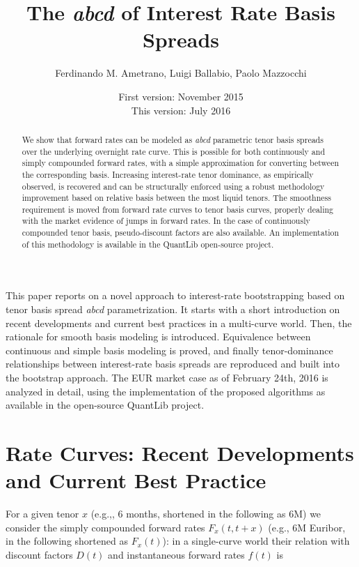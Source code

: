 \documentclass{article}
\title{The \textit{abcd} of Interest Rate Basis Spreads}
\author{Ferdinando M. Ametrano, Luigi Ballabio, Paolo Mazzocchi}
\date{First version: November 2015\\
      This version: July 2016}
\begin{document}
\maketitle

\begin{abstract}
    We show that forward rates can be modeled as \textit{abcd} parametric tenor basis spreads over the underlying overnight rate curve. This is possible for both continuously and simply compounded forward rates, with a simple approximation for converting between the corresponding basis. Increasing interest-rate tenor dominance, as empirically observed, is recovered and can be structurally enforced using a robust methodology improvement based on relative basis between the most liquid tenors. The smoothness requirement is moved from forward rate curves to tenor basis curves, properly dealing with the market evidence of jumps in forward rates. In the case of continuously compounded tenor basis, pseudo-discount factors are also available. An implementation of this methodology is available in the QuantLib open-source project.
\end{abstract}






\noindent
This paper reports on a novel approach to interest-rate bootstrapping based on tenor basis spread \textit{abcd} parametrization.
It starts with a short introduction on recent developments and current best practices in a multi-curve world. Then, the rationale for smooth basis modeling is introduced. Equivalence between continuous and simple basis modeling is proved, and finally tenor-dominance relationships between interest-rate basis spreads are reproduced and built into the bootstrap approach. The EUR market case as of February 24th, 2016 is analyzed in detail, using the implementation of the proposed algorithms as available in the open-source QuantLib \cite{QuantLib} project.









\section{Rate Curves: Recent Developments and Current Best Practice}

For a given tenor $x$ (e.g.,, 6 months, shortened in the following as 6M) we consider the simply compounded forward rates $F_x(t, t+x)$ (e.g., 6M Euribor, in the following shortened as $F_x(t)$): in a single-curve world their relation with discount factors $D(t)$ and instantaneous forward rates $f(t)$ is
\end{document}
